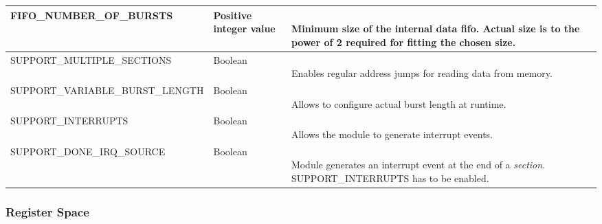 \begin{longtable}[ht]{|l|l|l|}
    \small{FIFO\_NUMBER\_OF\_BURSTS} & Positive integer value & \parbox{5cm}{\ \\
        Minimum size of the internal data fifo. Actual size is to the power of 2 required for fitting the chosen size.\vspace{0.3em}
    }\\
    \hline
    
    \small{SUPPORT\_MULTIPLE\_SECTIONS} & Boolean & \parbox{5cm}{\ \\
        Enables regular address jumps for reading data from memory.\vspace{0.3em}
    }\\
    \hline
    
    \small{SUPPORT\_VARIABLE\_BURST\_LENGTH} & Boolean & \parbox{5cm}{\ \\
        Allows to configure actual burst length at runtime.\vspace{0.3em}
    }\\
    \hline
    
    \small{SUPPORT\_INTERRUPTS} & Boolean & \parbox{5cm}{\ \\
        Allows the module to generate interrupt events.\vspace{0.3em}
    }\\
    \hline
    
    \small{SUPPORT\_DONE\_IRQ\_SOURCE} & Boolean & \parbox{5cm}{\ \\
        Module generates an interrupt event at the end of a \textit{section}.\\
        \small{SUPPORT\_INTERRUPTS} has to be enabled.\vspace{0.3em}
    }\\
    \hline
    
\end{longtable}

\subsubsection{Register Space}

